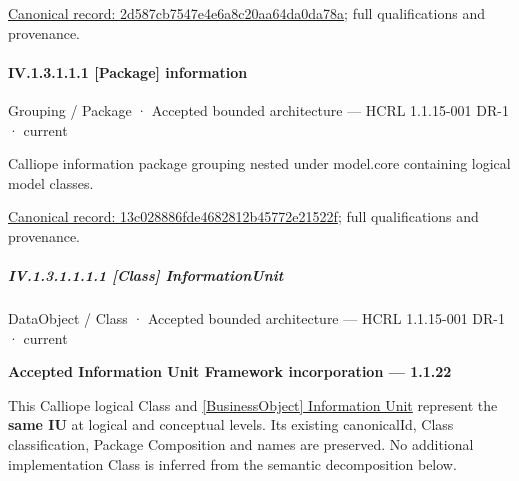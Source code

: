 {\footnotesize \href{../../../../continuum/grouping/package/2d587cb7547e4e6a8c20aa64da0da78a.md}{Canonical record: 2d587cb7547e4e6a8c20aa64da0da78a}; full qualifications and provenance.}\par
\paragraph*{IV.1.3.1.1.1 [Package] information}
\label{navigation:IV.1.3.1.1.1}

\label{element:13c028886fde4682812b45772e21522f}
{\small Grouping / Package · Accepted bounded architecture — HCRL 1.1.15-001 DR-1 · current}\par

Calliope information package grouping nested under model.core containing logical model classes.


{\footnotesize \href{../../../../continuum/grouping/package/13c028886fde4682812b45772e21522f.md}{Canonical record: 13c028886fde4682812b45772e21522f}; full qualifications and provenance.}\par
\subparagraph*{IV.1.3.1.1.1.1 [Class] InformationUnit}
\label{navigation:IV.1.3.1.1.1.1}

\label{element:74ec609de1ae498fbf9d13e4ef8c6cbe}
{\small DataObject / Class · Accepted bounded architecture — HCRL 1.1.15-001 DR-1 · current}\par

\par\medskip\textbf{Accepted Information Unit Framework incorporation — 1.1.22}\par


This Calliope logical Class and \hyperref[element:10284034c8534b639284386b064f2c54]{[BusinessObject] Information Unit} represent the \textbf{same IU} at
logical and conceptual levels. Its existing canonicalId, Class classification,
Package Composition and names are preserved. No additional implementation Class
is inferred from the semantic decomposition below.




